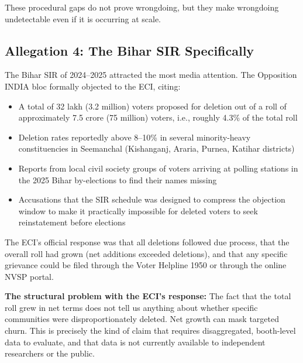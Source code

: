\documentclass[11pt, a4paper]{article}
\begin{document}
These procedural gaps do not prove wrongdoing, but they make wrongdoing undetectable even if it is occurring at scale.

\subsection{Allegation 4: The Bihar SIR Specifically}

The Bihar SIR of 2024--2025 attracted the most media attention. The Opposition INDIA bloc formally objected to the ECI, citing:

\begin{itemize}[leftmargin=1.5em, itemsep=3pt]
  \item A total of 32 lakh (3.2 million) voters proposed for deletion out of a roll of approximately 7.5 crore (75 million) voters, i.e., roughly 4.3\% of the total roll
  \item Deletion rates reportedly above 8--10\% in several minority-heavy constituencies in Seemanchal (Kishanganj, Araria, Purnea, Katihar districts)
  \item Reports from local civil society groups of voters arriving at polling stations in the 2025 Bihar by-elections to find their names missing
  \item Accusations that the SIR schedule was designed to compress the objection window to make it practically impossible for deleted voters to seek reinstatement before elections
\end{itemize}

The ECI's official response was that all deletions followed due process, that the overall roll had grown (net additions exceeded deletions), and that any specific grievance could be filed through the Voter Helpline 1950 or through the online NVSP portal.

\vspace{0.5em}

\begin{tcolorbox}[colback=warnorange!8, colframe=warnorange, sharp corners, boxrule=0.6pt]
\textbf{The structural problem with the ECI's response:} The fact that the total roll grew in net terms does not tell us anything about whether specific communities were disproportionately deleted. Net growth can mask targeted churn. This is precisely the kind of claim that requires disaggregated, booth-level data to evaluate, and that data is not currently available to independent researchers or the public.
\end{tcolorbox}
\end{document}
